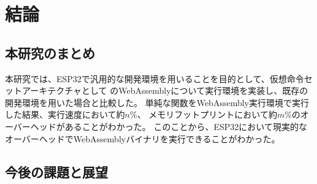 \chapter{結論}
\label{chap:conclusion}

\section{本研究のまとめ}

本研究では、ESP32で汎用的な開発環境を用いることを目的として、仮想命令セットアーキテクチャとして
のWebAssemblyについて実行環境を実装し、既存の開発環境を用いた場合と比較した。
単純な関数をWebAssembly実行環境で実行した結果、実行速度において約$n$\%、
メモリフットプリントにおいて約$m$\%のオーバーヘッドがあることがわかった。
このことから、ESP32において現実的なオーバーヘッドでWebAssemblyバイナリを実行できることがわかった。

\section{今後の課題と展望}
